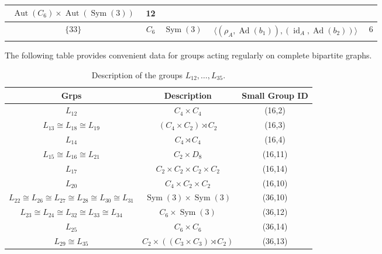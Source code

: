 \documentclass[dvipsnames]{article}
\theoremstyle{definition}
\theoremstyle{remark}
\DeclareMathOperator{\Sym}{Sym}
\DeclareMathOperator{\Aut}{Aut}
\DeclareMathOperator{\id}{id}
\DeclareMathOperator{\Ad}{Ad}
\begin{document}
\begin{longtable}{ |c|c|c|c|c|}
\begin{minipage}{3.5cm}
{\begin{align*}
            \Aut(C_6) \times \Aut(\Sym(3))
        \end{align*}
        \vspace{-5mm}
        }
    \end{minipage}
    &12\\
    \hline
    $\{33\}$
    &
    $C_6$
    &
    $\Sym(3)$
    &
    \begin{minipage}{3.5cm}
        {
        \vspace{-2.5mm}
        \begin{align*}
            \langle \left(\rho_A, \Ad(b_1) \right), \left(\id_A, \Ad(b_2) \right) \rangle
        \end{align*}
        \vspace{-5mm}
        }
    \end{minipage}
    &6\\
    \hline
    \end{longtable}

    The following table provides convenient data for groups acting regularly on complete bipartite graphs.

    \begin{longtable}{|c|c|c|}
    \caption{Description of the groups $L_{12}, \dots, L_{35}$.}
    \label{tbl:descriptionL12L35}\\
    \hline
    Grps & Description & Small Group ID \\
    \hline
    $L_{12}$ & $C_4 \times C_4$ & (16,2) \\
    \hline
    $L_{13} \cong L_{18} \cong L_{19}$ & $(C_4 \times C_2) \rtimes C_2$ & (16,3) \\
    \hline
    $L_{14}$ & $C_4 \rtimes C_4$ & (16,4)\\
    \hline
    $L_{15} \cong L_{16} \cong L_{21}$ & $C_2 \times D_8$ & (16,11) \\
    \hline
    $L_{17}$ & $C_2 \times C_2 \times C_2 \times C_2$ & (16,14) \\
    \hline
    $L_{20}$ & $C_4 \times C_2 \times C_2$ & (16,10)\\
    \hline
    $L_{22} \cong L_{26} \cong L_{27} \cong L_{28} \cong L_{30} \cong L_{31}$ & $\Sym(3)\times \Sym(3)$ & (36,10) \\
    \hline
    $L_{23} \cong L_{24} \cong L_{32} \cong L_{33} \cong L_{34}$ & $C_6 \times \Sym(3)$ & (36,12)\\
    \hline
    $L_{25}$ & $C_6\times C_6$ & (36,14) \\
    \hline
    $L_{29} \cong L_{35}$ & $C_2\times ((C_3 \times C_3) \rtimes C_2)$ & (36,13)\\
    \hline
    \end{longtable}

    \printbibliography
    
\end{document}
